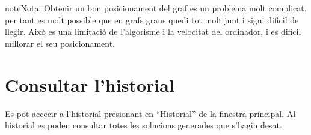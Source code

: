 \documentclass[a4paper,10pt,oneside]{sphinxmanual}
\begin{document}
\begin{notice}{note}{Nota:}
Obtenir un bon posicionament del graf es un problema molt complicat, per tant es molt possible que en grafs grans quedi tot molt junt i sigui dificil de llegir. Això es una limitació de l'algorisme i la velocitat del ordinador, i es dificil millorar el seu posicionament.
\end{notice}


\chapter{Consultar l'historial}
\label{consult_hist:consultar-l-historial}\label{consult_hist::doc}
Es pot accecir a l'historial presionant en ``Historial'' de la finestra principal.
Al historial es poden consultar totes les solucions generades que s'hagin desat.
\end{document}
